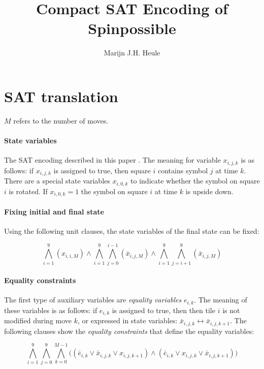 \documentclass[]{llncs}
\author{Marijn J.H. Heule}
\institute{Department of Software Technology\\
Delft University of Technology\\
\email{marijn@heule.nl}}
\title{Compact SAT Encoding of Spinpossible}
\begin{document}
\maketitle


\section{SAT translation}

$M$ refers to the number of moves.

\paragraph{State variables} The SAT encoding described in this paper . The meaning for variable $x_{i,j,k}$ is as follows: if $x_{i,j,k}$ is assigned to true, then square $i$ contains symbol $j$ at time $k$.
There are a special state variables $x_{i,0,k}$ to indicate whether the symbol on square $i$ is rotated. If $x_{i,0,k} = 1$ the symbol on square $i$ at time $k$ is upside down.  

\paragraph{Fixing initial and final state} Using the following unit clauses, the state variables of the final state can be fixed:

\begin{equation}
\bigwedge_{i=1}^9  (x_{i,i,M}) \land \bigwedge_{i=1}^9 \bigwedge_{j=0}^{i-1} (\bar x_{i,j ,M}) \land  \bigwedge_{i=1}^9 \bigwedge_{j=i+1}^{9} (\bar x_{i,j ,M})
\end{equation}

\paragraph{Equality constraints} The first type of auxiliary variables are {\em equality variables} $e_{i,k}$. The meaning of these variables is as follows: if $e_{i,k}$ is assigned to true, then then
tile $i$ is not modified during move $k$, or expressed in state variables: $\bar x_{i,j,k} \leftrightarrow \bar x_{i,j,k+1}$. The following clauses show the {\em equality constraints} that define
the equality variables:

\begin{equation}
\bigwedge_{i=1}^9 \bigwedge_{j=0}^9 \bigwedge_{k=0}^{M-1} \big( (\bar e_{i,k} \lor \bar x_{i,j,k} \lor x_{i,j,k+1}) \land (\bar e_{i,k} \lor x_{i,j,k} \lor \bar x_{i,j,k+1}) \big )
\end{equation}
\end{document}
